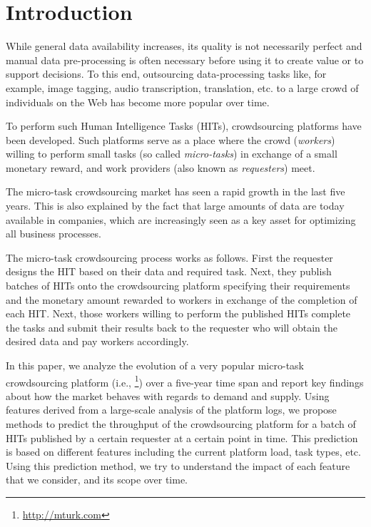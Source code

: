 \section{Introduction}\label{sec:intro}
% 
While general data availability increases, its quality is not necessarily perfect and manual data pre-processing is often necessary before using it to create value or to support decisions.
% 
To this end, outsourcing  data-processing tasks like, for example, image tagging, audio transcription, translation, etc. to a large crowd of individuals on the Web has become more popular over time.

To perform such Human Intelligence Tasks (HITs), crowdsourcing platforms have been developed. Such platforms serve as a place where the crowd (\emph{workers}) willing to perform small tasks (so called \emph{micro-tasks}) in exchange of a small monetary reward, and work providers (also known as \emph{requesters}) meet. 

The micro-task crowdsourcing market has seen a rapid growth in the last five years. This is also explained by the fact that large amounts of data are today available in companies, which are increasingly seen as a key asset for optimizing all business processes.

The  micro-task crowdsourcing process works as follows. First the requester designs the HIT based on their data and required task. Next, they publish batches of HITs onto the crowdsourcing platform specifying their requirements and the monetary amount rewarded to workers in exchange of the completion of each HIT. Next, those workers willing to perform the published HITs complete the tasks and submit their results back to the requester who will obtain the desired data and pay workers accordingly.

In this paper, we analyze the evolution of a very popular micro-task crowdsourcing platform (i.e., \amt{}\footnote{\url{http://mturk.com}}) over a  five-year time span and report key findings about how
the market behaves with regards to demand and supply.
% 
Using features derived from a large-scale analysis of the platform logs, we propose methods to predict the throughput of the crowdsourcing platform for a batch of HITs published by a certain requester at a certain point in time. This prediction is based on different features including the current platform load, task types, etc. Using this prediction method, we try to understand the impact of each feature that we consider, and its scope over time.

